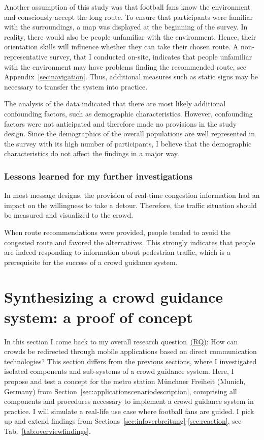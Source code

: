Another assumption of this study was that football fans know the environment and consciously accept the long route. To ensure that participants were familiar with the surroundings, a map was displayed at the beginning of the survey. In reality, there would also be people unfamiliar with the environment. Hence, their orientation skills will influence whether they can take their chosen route. A non-representative survey, that I conducted on-site, indicates that people unfamiliar with the environment may have problems finding the recommended route, see Appendix~\ref{sec:navigation}. Thus, additional measures such as static signs may be necessary to transfer the system into practice.

The analysis of the data indicated that there are most likely additional confounding factors, such as demographic characteristics. However, confounding factors were not anticipated and therefore made no provisions in the study design. Since the demographics of the overall populations are well represented in the survey with its high number of participants, I believe that the demographic characteristics do not affect the findings in a major way.

\subsubsection{Lessons learned for my further investigations}

In most message designs, the provision of real-time congestion information had an impact on the willingness to take a detour. Therefore, the traffic situation should be measured and visualized to the crowd. 

When route recommendations were provided, people tended to avoid the congested route and favored the alternatives. This strongly indicates that people are indeed responding to information about pedestrian traffic, which is a prerequisite for the success of a crowd guidance system.



\newpage

\section{Synthesizing a crowd guidance system: a proof of concept}
\label{sec:realistiscscenario}
In this section I come back to my overall research question~\hyperref[reserachquestions]{(RQ)}: How can crowds be redirected through mobile applications based on direct communication technologies? 
%
This section differs from the previous sections, where I investigated isolated components and sub-systems of a crowd guidance system. Here, I propose and test a concept for the metro station Münchner Freiheit (Munich, Germany) from Section~\ref{sec:applicationscenariodescription}, comprising all components and procedures necessary to implement a crowd guidance system in practice. 
I will simulate a real-life use case where football fans are guided. I pick up and extend findings from Sections~\ref{sec:infoverbreitung}-\ref{sec:reaction}, see Tab.~\ref{tab:overviewfindings}.


